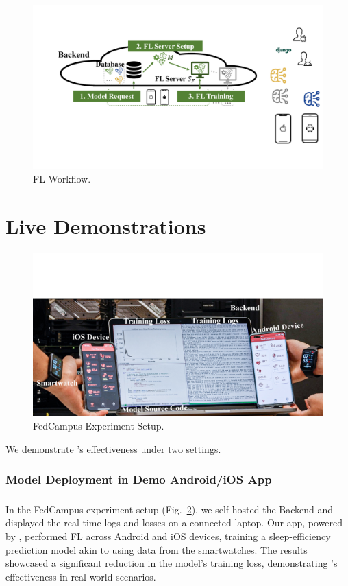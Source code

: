 \documentclass[conference]{IEEEtran}
\begin{document}
\begin{figure}
    \centering
    \includegraphics*[width=0.9\linewidth]{fl_workflow.pdf}
    \caption{\FedKit{} FL Workflow.}
    \label{fig:fl-workflow}
\end{figure}

\section{Live Demonstrations}

\begin{figure}
    \centering
    \includegraphics*[width=0.9\linewidth]{fedcampus.pdf}
    \caption{FedCampus Experiment Setup.}
    \label{fig:fedcampus}
\end{figure}

We demonstrate \FedKit{}'s effectiveness under two settings.

\subsubsection{Model Deployment in Demo Android/iOS App}

\subsubsection{\FedCampus{}}
In the FedCampus experiment setup (Fig.~\ref{fig:fedcampus}),
we self-hosted the Backend
and displayed the real-time logs and losses on a connected laptop.
Our app, powered by \FedKit{},
performed FL across Android and iOS devices,
training a sleep-efficiency prediction model
akin to \cite{khoa2022fedmcrnn}
using data from the smartwatches.
The results showcased a significant reduction in the model's training loss,
demonstrating \FedKit{}'s effectiveness in real-world scenarios.




\vspace{12pt}
\color{red}
\end{document}

